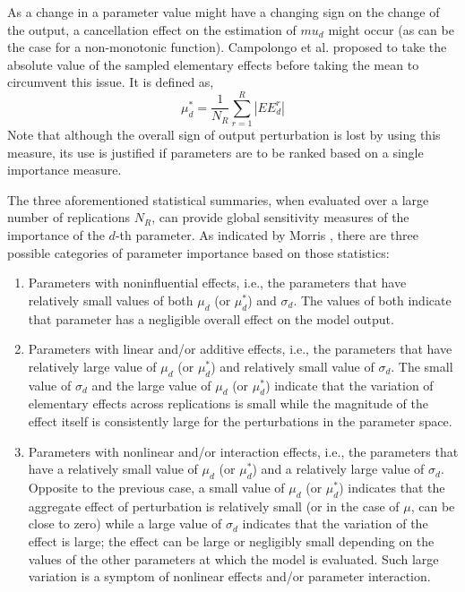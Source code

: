 As a change in a parameter value might have a changing sign on the change of the output,
a cancellation effect on the estimation of $mu_d$ might occur 
(as can be the case for a non-monotonic function).
Campolongo et al. \cite{Campolongo2011} proposed to take the absolute value of the sampled elementary effects before taking the mean to circumvent this issue.
It is defined as,
\begin{equation}
	\mu^*_d = \frac{1}{N_R} \sum_{r = 1}^{R} |EE^r_d|
	\label{eq:sa_morris_mustar}
\end{equation}
Note that although the overall sign of output perturbation is lost by using this measure,
its use is justified if parameters are to be ranked based on a single importance measure.

The three aforementioned statistical summaries, when evaluated over a large number of replications $N_R$,
can provide global sensitivity measures of the importance of the $d$-th parameter.
As indicated by Morris \cite{Morris1991}, there are three possible categories of parameter importance based on those statistics:
\begin{enumerate}
	\item Parameters with noninfluential effects, i.e., the parameters that have relatively small values of both $\mu_d$ (or $\mu^*_d$) and $\sigma_d$.
	The values of both indicate that parameter has a negligible overall effect on the model output.
	\item Parameters with linear and/or additive effects, i.e., the parameters that have relatively large value of $\mu_d$ (or $\mu^*_d$) and relatively small value of $\sigma_d$.
	The small value of $\sigma_d$ and the large value of $\mu_d$ (or $\mu^*_d$) indicate that the variation of elementary effects across replications is small while the magnitude of the effect itself is consistently large for the perturbations in the parameter space.
	\item Parameters with nonlinear and/or interaction effects, i.e., the parameters that have a relatively small value of $\mu_d$ (or $\mu^*_d$) and a relatively large value of $\sigma_d$.
	Opposite to the previous case, a small value of $\mu_d$ (or $\mu^*_d$) indicates that the aggregate effect of perturbation is relatively small (or in the case of $\mu$, can be close to zero) while a large value of $\sigma_d$ indicates that the variation of the effect is large; the effect can be large or negligibly small depending on the values of the other parameters at which the model is evaluated.
	Such large variation is a symptom of nonlinear effects and/or parameter interaction.
\end{enumerate}

